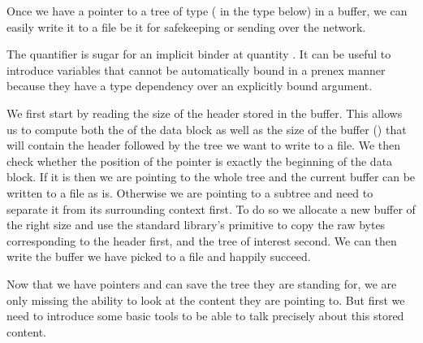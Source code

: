 Once we have a pointer to a tree  of type 
(   in the type below)
in a buffer, we can easily write it to a file be it for safekeeping
or sending over the network.



\begin{remark}
  The  quantifier is sugar for an implicit
  binder at quantity .
  It can be useful to introduce variables that cannot be automatically
  bound in a prenex manner because they have a type dependency over an
  explicitly bound argument.
\end{remark}


We first start by reading the size of the header stored in the buffer.
%
This allows us to compute both the  of the data block
as well as the size of the buffer () that will
contain the header followed by the tree we want to write to a file.
%
We then check whether the position of the pointer is exactly the beginning
of the data block.
%
If it is then we are pointing to the whole tree and the current buffer can
be written to a file as is.
%
Otherwise we are pointing to a subtree and need to separate it from its
surrounding context first.
%
To do so we allocate a new buffer of the right size and use the
standard library's  primitive to copy the raw bytes
corresponding to the header first, and the tree of interest second.
%
We can then write the buffer we have picked to a file and happily succeed.



Now that we have pointers and can save the tree they are standing for,
we are only missing the ability to look at the content they are pointing to.
%
But first we need to introduce some basic tools
to be able to talk precisely about this stored content.

